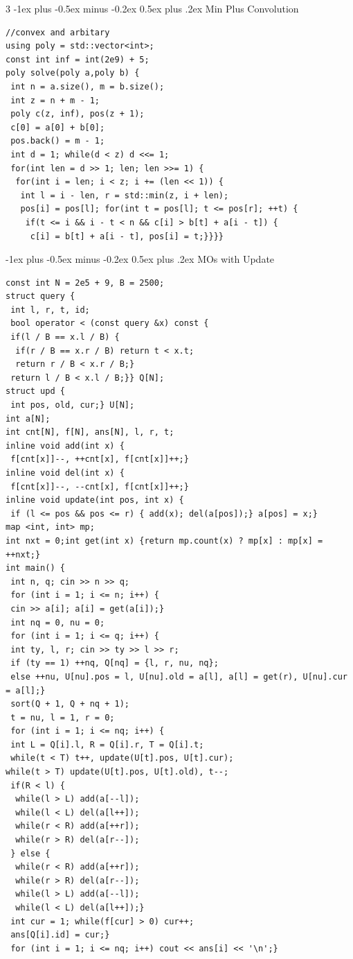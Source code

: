 \documentclass[8pt,a4paper,onesided]{article}
\makeatletter
\renewcommand{\subsection}{\@startsection{subsection}{2}{0mm}
    {-1ex plus -0.5ex minus -0.2ex} %
    {0.5ex plus .2ex}                %
    {\normalfont\large\bfseries}}    %
\makeatother
\begin{document}
\begin{multicols}{3}
\subsection{Min Plus Convolution}
\begin{verbatim}
//convex and arbitary
using poly = std::vector<int>;
const int inf = int(2e9) + 5;
poly solve(poly a,poly b) {
 int n = a.size(), m = b.size();
 int z = n + m - 1;
 poly c(z, inf), pos(z + 1);
 c[0] = a[0] + b[0];
 pos.back() = m - 1;
 int d = 1; while(d < z) d <<= 1;
 for(int len = d >> 1; len; len >>= 1) {
  for(int i = len; i < z; i += (len << 1)) {
   int l = i - len, r = std::min(z, i + len);
   pos[i] = pos[l]; for(int t = pos[l]; t <= pos[r]; ++t) {
    if(t <= i && i - t < n && c[i] > b[t] + a[i - t]) {
     c[i] = b[t] + a[i - t], pos[i] = t;}}}}
\end{verbatim}
\subsection{MOs with Update}
\begin{verbatim}
const int N = 2e5 + 9, B = 2500;
struct query {
 int l, r, t, id;
 bool operator < (const query &x) const {
 if(l / B == x.l / B) {
  if(r / B == x.r / B) return t < x.t;
  return r / B < x.r / B;}
 return l / B < x.l / B;}} Q[N];
struct upd {
 int pos, old, cur;} U[N];
int a[N];
int cnt[N], f[N], ans[N], l, r, t;
inline void add(int x) {
 f[cnt[x]]--, ++cnt[x], f[cnt[x]]++;}
inline void del(int x) {
 f[cnt[x]]--, --cnt[x], f[cnt[x]]++;}
inline void update(int pos, int x) {
 if (l <= pos && pos <= r) { add(x); del(a[pos]);} a[pos] = x;}
map <int, int> mp;
int nxt = 0;int get(int x) {return mp.count(x) ? mp[x] : mp[x] = ++nxt;}
int main() {
 int n, q; cin >> n >> q;
 for (int i = 1; i <= n; i++) {
 cin >> a[i]; a[i] = get(a[i]);}
 int nq = 0, nu = 0;
 for (int i = 1; i <= q; i++) {
 int ty, l, r; cin >> ty >> l >> r;
 if (ty == 1) ++nq, Q[nq] = {l, r, nu, nq};
 else ++nu, U[nu].pos = l, U[nu].old = a[l], a[l] = get(r), U[nu].cur = a[l];}
 sort(Q + 1, Q + nq + 1);
 t = nu, l = 1, r = 0;
 for (int i = 1; i <= nq; i++) {
 int L = Q[i].l, R = Q[i].r, T = Q[i].t;
 while(t < T) t++, update(U[t].pos, U[t].cur);
while(t > T) update(U[t].pos, U[t].old), t--;
 if(R < l) {
  while(l > L) add(a[--l]);
  while(l < L) del(a[l++]);
  while(r < R) add(a[++r]);
  while(r > R) del(a[r--]);
 } else {
  while(r < R) add(a[++r]);
  while(r > R) del(a[r--]);
  while(l > L) add(a[--l]);
  while(l < L) del(a[l++]);}
 int cur = 1; while(f[cur] > 0) cur++;
 ans[Q[i].id] = cur;}
 for (int i = 1; i <= nq; i++) cout << ans[i] << '\n';}
\end{verbatim}

\end{multicols}
\end{document}
